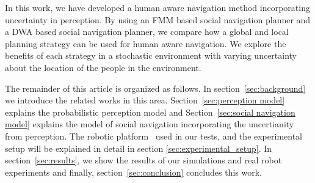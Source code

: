 In this work, we have developed a human aware navigation method incorporating uncertainty in perception. By using an FMM based social navigation planner and a DWA based social navigation planner, we compare how a global and local planning strategy can be used for human aware navigation. We explore the benefits of each strategy in a stochastic environment with varying uncertainty about the location of the people in the environment.


The remainder of this article is organized as follows. In section~\ref{sec:background} we introduce the related works in this area. Section~\ref{sec:perception model} explains the probabilistic perception model and Section~\ref{sec:social navigation model} explains the model of social navigation incorporating the uncertianity from perception. The robotic platform~\cite{Messias2014robotic} used in our tests, and the experimental setup will be explained in detail in section \ref{sec:experimental_setup}. In section~\ref{sec:results}, we show the results of our simulations and real robot experiments and finally, section~\ref{sec:conclusion} concludes this work.








